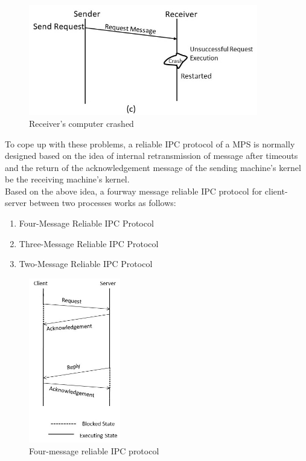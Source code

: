 \documentclass{beamer}
\begin{document}
\begin{frame}[allowframebreaks]
\begin{figure}
		\centering
		\includegraphics[width=10cm]{fig36(c).jpg}
		\caption{Receiver's computer crashed}
	\end{figure}
	\framebreak	
	To cope up with these problems, a reliable IPC protocol of a MPS is normally designed
	based on the idea of internal retransmission of message after timeouts and the return
	of the acknowledgement message of the sending machine's kernel be the receiving
	machine's kernel.\\Based on the above idea, a fourway message reliable IPC protocol
	for client-server between two processes works as follows:
	\begin{enumerate}
		\item Four-Message Reliable IPC Protocol
		\item Three-Message Reliable IPC Protocol
		\item Two-Message Reliable IPC Protocol
	\end{enumerate}		
	\begin{figure}
		\centering
		\includegraphics[width=4cm]{fig37.jpg}
		\caption{Four-message reliable IPC protocol}
	\end{figure}
\end{frame}
\end{document}
